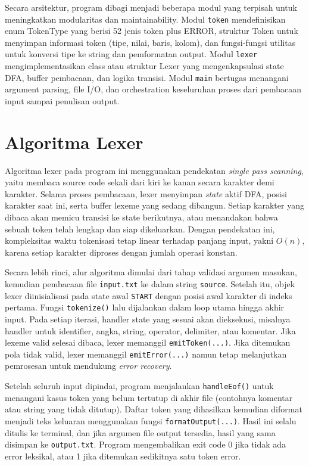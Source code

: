 Secara arsitektur, program dibagi menjadi beberapa modul yang terpisah untuk meningkatkan modularitas dan maintainability. Modul \texttt{token} mendefinisikan enum TokenType yang berisi 52 jenis token plus ERROR, struktur Token untuk menyimpan informasi token (tipe, nilai, baris, kolom), dan fungsi-fungsi utilitas untuk konversi tipe ke string dan pemformatan output. Modul \texttt{lexer} mengimplementasikan class atau struktur Lexer yang mengenkapsulasi state DFA, buffer pembacaan, dan logika transisi. Modul \texttt{main} bertugas menangani argument parsing, file I/O, dan orchestration keseluruhan proses dari pembacaan input sampai penulisan output.

\section{Algoritma Lexer}

Algoritma lexer pada program ini menggunakan pendekatan \textit{single pass scanning}, yaitu membaca source code sekali dari kiri ke kanan secara karakter demi karakter. Selama proses pembacaan, lexer menyimpan \textit{state} aktif DFA, posisi karakter saat ini, serta buffer lexeme yang sedang dibangun. Setiap karakter yang dibaca akan memicu transisi ke state berikutnya, atau menandakan bahwa sebuah token telah lengkap dan siap dikeluarkan. Dengan pendekatan ini, kompleksitas waktu tokenisasi tetap linear terhadap panjang input, yakni $O(n)$, karena setiap karakter diproses dengan jumlah operasi konstan.

Secara lebih rinci, alur algoritma dimulai dari tahap validasi argumen masukan, kemudian pembacaan file \texttt{input.txt} ke dalam string \texttt{source}. Setelah itu, objek lexer diinisialisasi pada state awal \texttt{START} dengan posisi awal karakter di indeks pertama. Fungsi \texttt{tokenize()} lalu dijalankan dalam loop utama hingga akhir input. Pada setiap iterasi, handler state yang sesuai akan dieksekusi, misalnya handler untuk identifier, angka, string, operator, delimiter, atau komentar. Jika lexeme valid selesai dibaca, lexer memanggil \texttt{emitToken(...)}. Jika ditemukan pola tidak valid, lexer memanggil \texttt{emitError(...)} namun tetap melanjutkan pemrosesan untuk mendukung \textit{error recovery}.

Setelah seluruh input dipindai, program menjalankan \texttt{handleEof()} untuk menangani kasus token yang belum tertutup di akhir file (contohnya komentar atau string yang tidak ditutup). Daftar token yang dihasilkan kemudian diformat menjadi teks keluaran menggunakan fungsi \texttt{formatOutput(...)}. Hasil ini selalu ditulis ke terminal, dan jika argumen file output tersedia, hasil yang sama disimpan ke \texttt{output.txt}. Program mengembalikan exit code 0 jika tidak ada error leksikal, atau 1 jika ditemukan sedikitnya satu token error.

